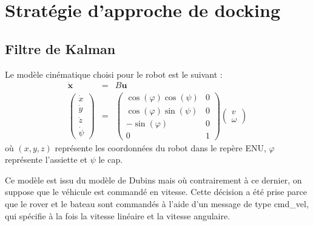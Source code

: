\documentclass[12pt]{report}
\begin{document}
\chapter{Stratégie d'approche de docking}

\section{Filtre de Kalman}

Le modèle cinématique choisi pour le robot est le suivant :
\begin{eqnarray}
     \mathbf{\dot{x}} & = & B \mathbf{u} \nonumber\\
     \label{eq:cinematic} \left( \begin{array}{c}
       \dot{x}\\
       \dot{y}\\
       \dot{z}\\
       \dot{\psi}
     \end{array} \right) & = & \left( \begin{array}{cc}
       \cos (\varphi) \cos (\psi) & 0\\
       \cos (\varphi) \sin (\psi) & 0\\
       - \sin (\varphi) & 0\\
       0 & 1
     \end{array} \right) \left( \begin{array}{c}
       v\\
       \omega
     \end{array} \right) 
   \end{eqnarray}
où $(x, y, z)$ représente les coordonnées du robot dans le repère ENU, $\varphi$ représente l'assiette et $\psi$ le cap.

Ce modèle est issu du modèle de Dubins mais où contrairement à ce dernier, on suppose que le véhicule est commandé en vitesse. Cette décision a été prise parce que le rover et le bateau sont commandés à l'aide d'un message de type cmd\_vel, qui spécifie à la fois la vitesse linéaire et la vitesse angulaire.
\end{document}
